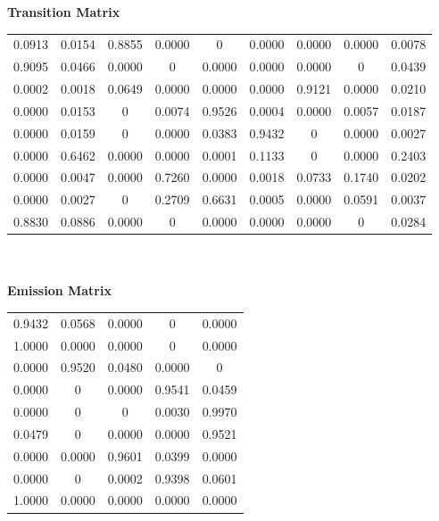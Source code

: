 \documentclass[12pt]{article}
\begin{document}
\textbf{Transition Matrix}

\begin{center}
\begin{tabular}{|c c c c c c c c c|}
    0.0913    &0.0154    &0.8855    &0.0000     &    0    &0.0000    &0.0000    &0.0000    &0.0078\\
    0.9095    &0.0466    &0.0000    &     0    &0.0000    &0.0000    &0.0000    &     0    &0.0439\\
    0.0002    &0.0018    &0.0649    &0.0000    &0.0000    &0.0000    &0.9121    &0.0000    &0.0210\\
    0.0000    &0.0153    &     0    &0.0074    &0.9526    &0.0004    &0.0000    &0.0057    &0.0187\\
    0.0000    &0.0159    &     0    &0.0000    &0.0383    &0.9432    &     0    &0.0000    &0.0027\\
    0.0000    &0.6462    &0.0000    &0.0000    &0.0001    &0.1133    &     0    &0.0000    &0.2403\\
    0.0000    &0.0047    &0.0000    &0.7260    &0.0000    &0.0018    &0.0733    &0.1740    &0.0202\\
    0.0000    &0.0027    &     0    &0.2709    &0.6631    &0.0005    &0.0000    &0.0591    &0.0037\\
    0.8830    &0.0886    &0.0000    &     0    &0.0000    &0.0000    &0.0000    &     0    &0.0284\\
\end{tabular}
\end{center}\\

\\
\textbf{Emission Matrix}

\begin{center}
\begin{tabular}{|c c c c c|}
    0.9432    &0.0568    &0.0000    &     0    &0.0000 \\
    1.0000    &0.0000    &0.0000    &     0    &0.0000 \\
    0.0000    &0.9520    &0.0480    &0.0000    &    0 \\
    0.0000    &     0    &0.0000    &0.9541    &0.0459 \\
    0.0000    &     0    &     0    &0.0030    &0.9970 \\
    0.0479    &     0    &0.0000    &0.0000    &0.9521 \\
    0.0000    &0.0000    &0.9601    &0.0399    &0.0000 \\
    0.0000    &     0    &0.0002    &0.9398    &0.0601 \\
    1.0000    &0.0000    &0.0000    &0.0000    &0.0000 \\
\end{tabular}
\end{center}
\end{document}
